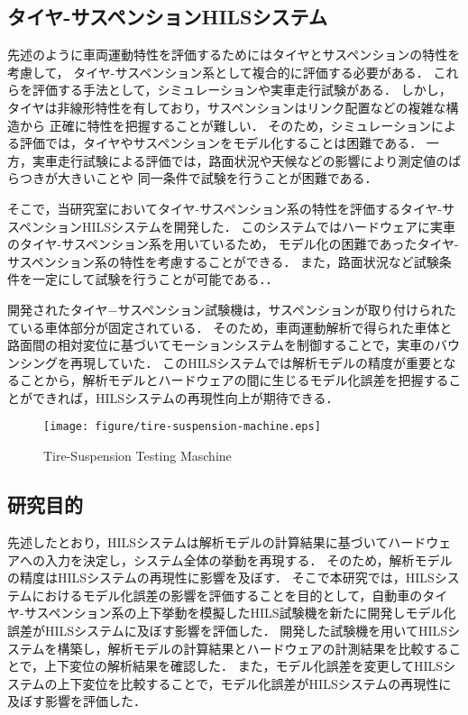 \documentclass[a4paper,12pt]{article_vdlab_sotsuron}
\begin{document}
\subsection{タイヤ-サスペンションHILSシステム}
先述のように車両運動特性を評価するためにはタイヤとサスペンションの特性を考慮して，
タイヤ-サスペンション系として複合的に評価する必要がある．
これらを評価する手法として，シミュレーションや実車走行試験がある．
しかし，タイヤは非線形特性を有しており，サスペンションはリンク配置などの複雑な構造から
正確に特性を把握することが難しい．
そのため，シミュレーションによる評価では，タイヤやサスペンションをモデル化することは困難である．
一方，実車走行試験による評価では，路面状況や天候などの影響により測定値のばらつきが大きいことや
同一条件で試験を行うことが困難である．
\par
そこで，当研究室においてタイヤ-サスペンション系の特性を評価するタイヤ-サスペンションHILSシステムを開発した．
このシステムではハードウェアに実車のタイヤ-サスペンション系を用いているため，
モデル化の困難であったタイヤ-サスペンション系の特性を考慮することができる．
また，路面状況など試験条件を一定にして試験を行うことが可能である．\cite{yamato}．
\par
開発されたタイヤ−サスペンション試験機は，サスペンションが取り付けられたている車体部分が固定されている．
そのため，車両運動解析で得られた車体と路面間の相対変位に基づいてモーションシステムを制御することで，実車のバウンシングを再現していた．
このHILSシステムでは解析モデルの精度が重要となることから，解析モデルとハードウェアの間に生じるモデル化誤差を把握することができれば，HILSシステムの再現性向上が期待できる．

\vspace{12mm}
\begin{figure}[h]
  \centering
  \texttt{[image: figure/tire-suspension-machine.eps]}
  \vspace{4mm}
   \caption{Tire-Suspension Testing Maschine}
  \label{fig:tiresusmachine}
\end{figure}

\newpage
\subsection{研究目的}
先述したとおり，HILSシステムは解析モデルの計算結果に基づいてハードウェアへの入力を決定し，システム全体の挙動を再現する．
そのため，解析モデルの精度はHILSシステムの再現性に影響を及ぼす．
そこで本研究では，HILSシステムにおけるモデル化誤差の影響を評価することを目的として，自動車のタイヤ-サスペンション系の上下挙動を模擬したHILS試験機を新たに開発しモデル化誤差がHILSシステムに及ぼす影響を評価した．
開発した試験機を用いてHILSシステムを構築し，解析モデルの計算結果とハードウェアの計測結果を比較することで，上下変位の解析結果を確認した．
また，モデル化誤差を変更してHILSシステムの上下変位を比較することで，モデル化誤差がHILSシステムの再現性に及ぼす影響を評価した．
\end{document}
